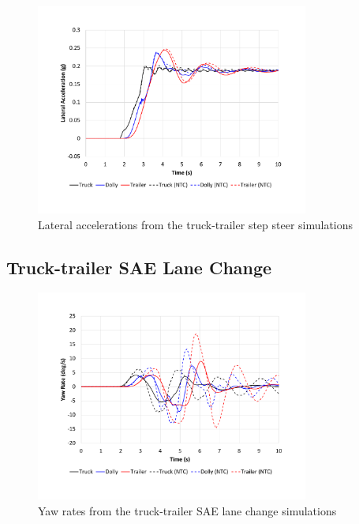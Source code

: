 \begin{figure}[H]
	\centering
	\includegraphics[width=0.8\textwidth]{fig/ntc-truck-trailer_ssc}
	\caption{Lateral accelerations from the truck-trailer step steer simulations}
	\label{figure:ntc-truck-trailer_ssc}
\end{figure}

\subsection{Truck-trailer SAE Lane Change}\label{appendix:truck-trailer-validation-lc}

\begin{figure}[H]
	\centering
	\includegraphics[width=0.8\textwidth]{fig/ntc-truck-trailer_lcc}
	\caption{Yaw rates from the truck-trailer SAE lane change simulations}
	\label{figure:ntc-truck-trailer_lcc}
\end{figure}

